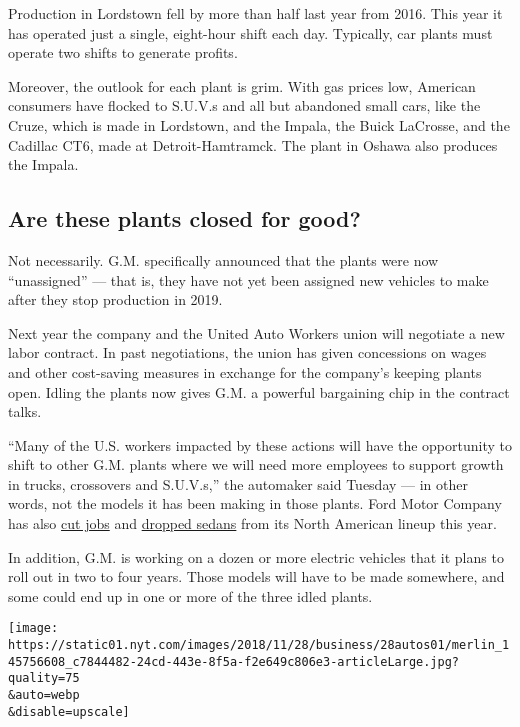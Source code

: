 Production in Lordstown fell by more than half last year from 2016. This
year it has operated just a single, eight-hour shift each day.
Typically, car plants must operate two shifts to generate profits.

Moreover, the outlook for each plant is grim. With gas prices low,
American consumers have flocked to S.U.V.s and all but abandoned small
cars, like the Cruze, which is made in Lordstown, and the Impala, the
Buick LaCrosse, and the Cadillac CT6, made at Detroit-Hamtramck. The
plant in Oshawa also produces the Impala.

\hypertarget{are-these-plants-closed-for-good}{%
\subsection{Are these plants closed for
good?}\label{are-these-plants-closed-for-good}}

Not necessarily. G.M. specifically announced that the plants were now
``unassigned'' --- that is, they have not yet been assigned new vehicles
to make after they stop production in 2019.

Next year the company and the United Auto Workers union will negotiate a
new labor contract. In past negotiations, the union has given
concessions on wages and other cost-saving measures in exchange for the
company's keeping plants open. Idling the plants now gives G.M. a
powerful bargaining chip in the contract talks.

``Many of the U.S. workers impacted by these actions will have the
opportunity to shift to other G.M. plants where we will need more
employees to support growth in trucks, crossovers and S.U.V.s,'' the
automaker said Tuesday --- in other words, not the models it has been
making in those plants. Ford Motor Company has also
\href{https://www.nytimes.com/2018/10/05/business/ford-motor-cars.html}{cut
jobs} and
\href{https://www.nytimes.com/2018/04/25/business/ford-earnings.html}{dropped
sedans} from its North American lineup this year.

In addition, G.M. is working on a dozen or more electric vehicles that
it plans to roll out in two to four years. Those models will have to be
made somewhere, and some could end up in one or more of the three idled
plants.

\texttt{[image: https://static01.nyt.com/images/2018/11/28/business/28autos01/merlin\_145756608\_c7844482-24cd-443e-8f5a-f2e649c806e3-articleLarge.jpg?quality=75\\\&auto=webp\\\&disable=upscale]}

